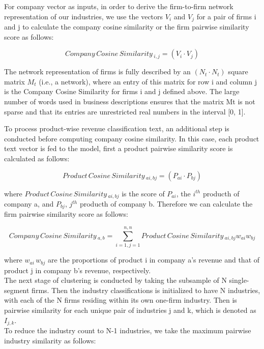 \documentclass[12pt]{article}
\begin{document}
For company vector as inputs, in order to derive the firm-to-firm network 
representation of our industries, we use the vectors $V_i$ and $V_j$ for 
a pair of firms i and j to calculate the company cosine similarity or 
the firm pairwise similarity score as follows: 

\begin{equation}
    Company\,Cosine\,Similarity\,_{i,j}=\left(V_i \cdot V_j\right)
\end{equation}

The network representation of firms is fully described by an $\left(N_t \cdot N_t\right)$ square 
matrix $M_t$ (i.e., a network), where an entry of this matrix for row i and column j 
is the Company Cosine Similarity for firms i and j defined above. The large 
number of words used in business descriptions ensures that the matrix Mt is not 
sparse and that its entries are unrestricted real numbers in the interval [0, 1]. 

To process product-wise revenue classification text, an additional step is conducted 
before computing company cosine similarity. In this case, each product text vector is 
fed to the model, first a product pairwise similarity score is calculated as follows: 

\begin{equation}
    Product\,Cosine\,Similarity\,_{ai,bj}=\left(P_{ai} \cdot P_{bj}\right)
\end{equation}

\noindent where $Product\,Cosine\,Similarity\,_{ai,bj}$ is the score of $P_{ai}$, the 
$i^{th}$ producth of company a, and $P_{bj}$, $j^{th}$ producth of company b.
Therefore we can calculate the firm pairwise similarity score as follows: 

\begin{equation}
    Company\,Cosine\,Similarity\,_{a,b}=
    \sum_{i=1,j=1}^{n,n}Product\,Cosine\,Similarity
    \,_{ai,bj}w_{ai}w_{bj}
\end{equation}

\noindent where $w_{ai}\,w_{bj}$ are the proportions of product i in company a's revenue and 
that of product j in company b's revenue, respectively.\\

The next stage of clustering \cite{NBERw15991} is conducted by taking the subsample of N single-segment firms. 
Then the industry classifications is initialized to have N industries, with each of the N firms 
residing within its own one-firm industry. Then is pairwise similarity for each unique pair of 
industries j and k, which is denoted as $I_{j,k}$.\\
To reduce the industry count to N-1 industries, we take the maximum pairwise industry similarity as follows:
\end{document}
